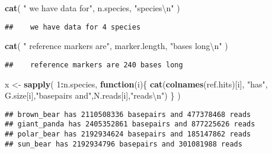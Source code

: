 \documentclass[]{article}
\newenvironment{Shaded}{\begin{snugshade}}{\end{snugshade}}
\newcommand{\KeywordTok}[1]{\textcolor[rgb]{0.13,0.29,0.53}{\textbf{#1}}}
\newcommand{\DecValTok}[1]{\textcolor[rgb]{0.00,0.00,0.81}{#1}}
\newcommand{\CharTok}[1]{\textcolor[rgb]{0.31,0.60,0.02}{#1}}
\newcommand{\StringTok}[1]{\textcolor[rgb]{0.31,0.60,0.02}{#1}}
\newcommand{\ControlFlowTok}[1]{\textcolor[rgb]{0.13,0.29,0.53}{\textbf{#1}}}
\newcommand{\OperatorTok}[1]{\textcolor[rgb]{0.81,0.36,0.00}{\textbf{#1}}}
\newcommand{\NormalTok}[1]{#1}
\begin{document}
\begin{Shaded}
\begin{Highlighting}[]
\KeywordTok{cat}\NormalTok{( }\StringTok{"   we have data for"}\NormalTok{, n.species, }\StringTok{"species}\CharTok{\textbackslash{}n}\StringTok{"}\NormalTok{ )}
\end{Highlighting}
\end{Shaded}

\begin{verbatim}
##    we have data for 4 species
\end{verbatim}

\begin{Shaded}
\begin{Highlighting}[]
\KeywordTok{cat}\NormalTok{( }\StringTok{"   reference markers are"}\NormalTok{, marker.length, }\StringTok{"bases long}\CharTok{\textbackslash{}n}\StringTok{"}\NormalTok{ )}
\end{Highlighting}
\end{Shaded}

\begin{verbatim}
##    reference markers are 240 bases long
\end{verbatim}

\begin{Shaded}
\begin{Highlighting}[]
\NormalTok{x <-}\StringTok{ }\KeywordTok{sapply}\NormalTok{( }\DecValTok{1}\OperatorTok{:}\NormalTok{n.species, }\ControlFlowTok{function}\NormalTok{(i)\{}
  \KeywordTok{cat}\NormalTok{(}\KeywordTok{colnames}\NormalTok{(ref.hits)[i], }\StringTok{"has"}\NormalTok{, G.size[i],}\StringTok{"basepairs and"}\NormalTok{,N.reads[i],}\StringTok{"reads}\CharTok{\textbackslash{}n}\StringTok{"}\NormalTok{)}
\NormalTok{\} )}
\end{Highlighting}
\end{Shaded}

\begin{verbatim}
## brown_bear has 2110508336 basepairs and 477378468 reads
## giant_panda has 2405352861 basepairs and 877225626 reads
## polar_bear has 2192934624 basepairs and 185147862 reads
## sun_bear has 2192934796 basepairs and 301081988 reads
\end{verbatim}
\end{document}

